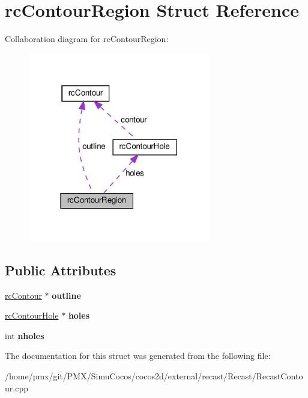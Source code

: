 \hypertarget{structrcContourRegion}{}\section{rc\+Contour\+Region Struct Reference}
\label{structrcContourRegion}


Collaboration diagram for rc\+Contour\+Region\+:
\nopagebreak
\begin{figure}[H]
\begin{center}
\leavevmode
\includegraphics[width=225pt]{structrcContourRegion__coll__graph}
\end{center}
\end{figure}
\subsection*{Public Attributes}
\begin{DoxyCompactItemize}
\item 
\mbox{\label{structrcContourRegion_ac25cb4605b376ce1f311517f04202836}} 
\hyperlink{structrcContour}{rc\+Contour} $\ast$ {\bfseries outline}
\item 
\mbox{\label{structrcContourRegion_ad63f5102de79fa8b525c32bfc1a25277}} 
\hyperlink{structrcContourHole}{rc\+Contour\+Hole} $\ast$ {\bfseries holes}
\item 
\mbox{\label{structrcContourRegion_a868d233f83da1275952c46874d808114}} 
int {\bfseries nholes}
\end{DoxyCompactItemize}


The documentation for this struct was generated from the following file\+:\begin{DoxyCompactItemize}
\item 
/home/pmx/git/\+P\+M\+X/\+Simu\+Cocos/cocos2d/external/recast/\+Recast/Recast\+Contour.\+cpp\end{DoxyCompactItemize}
